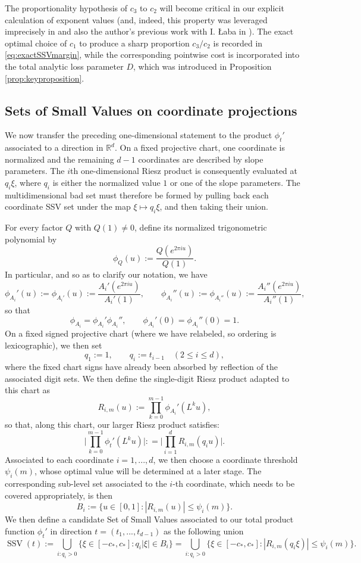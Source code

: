 \documentclass[12pt]{amsart}
\numberwithin{equation}{section}
\begin{document}
The proportionality hypothesis of $c_3$ to $c_2$ will become critical in our explicit calculation of exponent values (and, indeed, this property was leveraged imprecisely in \cite{BLV} and also the author's previous work with I. {\L}aba in \cite{LM}). The exact optimal choice of $c_1$ to produce a sharp proportion $c_3/c_2$ is recorded in \eqref{eq:exactSSVmargin}, while the corresponding pointwise cost is incorporated into the total analytic loss parameter $D$, which was introduced in Proposition \ref{prop:keyproposition}.

\subsection{Sets of Small Values on coordinate projections}

We now transfer the preceding one-dimensional statement to the product $\phi_t'$ associated to a direction in $\mathbb R^d$.  On a fixed projective chart, one coordinate is normalized and the remaining $d-1$ coordinates are described by slope parameters.  The $i$th one-dimensional Riesz product is consequently evaluated at $q_i\xi$, where $q_i$ is either the normalized value $1$ or one of the slope parameters.  The multidimensional bad set must therefore be formed by pulling back each coordinate SSV set under the map $\xi\mapsto q_i\xi$, and then taking their union.

For every factor $Q$ with $Q(1)\neq0$, define its normalized trigonometric
polynomial by
\[
 \phi_Q(u):=\frac{Q(e^{2\pi iu})}{Q(1)}.
\]
In particular, and so as to clarify our notation, we have
\[
 \phi_{A_i}'(u):= \phi_{A_i'} (u) :=\frac{A_i'(e^{2\pi iu})}{A_i'(1)},
 \qquad
 \phi_{A_i}''(u):= \phi_{A_i''} (u) :=\frac{A_i'' (e^{2\pi iu})}{A_i''(1)},
\]
so that
\[
 \phi_{A_i}=\phi_{A_i}'\phi_{A_i}'',
 \qquad
 \phi_{A_i}'(0)=\phi_{A_i}''(0)=1.
\]
On a fixed signed projective chart (where we have relabeled, so ordering is lexicographic), we then set
\[
 q_1:=1,
 \qquad
 q_i:=t_{i-1}\quad(2\leq i\leq d),
\]
where the fixed chart signs have already been absorbed by reflection of the associated digit sets. We then define the single-digit Riesz product adapted to this chart as
\[
 R_{i,m}(u):=\prod_{k=0}^{m-1}\phi_{A_i}'(L^ku),
\]
so that, along this chart, our larger Riesz product satisfies:
$$
\bigg\lvert \prod_{k=0}^{m-1} \phi_t' (L^k u) \bigg\rvert : = \bigg\lvert \prod_{i=1}^{d} R_{i,m} (q_i u)\bigg\rvert.
$$
Associated to each coordinate $i = 1,...,d$, we then choose a coordinate threshold $\psi_i(m)$, whose optimal value will be determined at a later stage.  The corresponding sub-level set associated to the $i$-th coordinate, which needs to be covered appropriately, is then
\[
 B_i:=\{u\in[0,1]:|R_{i,m}(u)|\leq\psi_i(m)\}.
\]
We then define a candidate Set of Small Values associated to our total product function $\phi_t'$ in direction $t = (t_1,...,t_{d-1})$ as the following union
\begin{equation}\label{eq:productSSVunion}
 \operatorname{SSV}(t)
 :=\bigcup_{i:q_i>0}\big\{\xi\in[-c_*,c_*]:q_i|\xi|\in B_i\big\}
 =\bigcup_{i:q_i>0}\big\{\xi\in[-c_*,c_*]:|R_{i,m}(q_i\xi)|\leq\psi_i(m)\big\}.
\end{equation}
\end{document}
